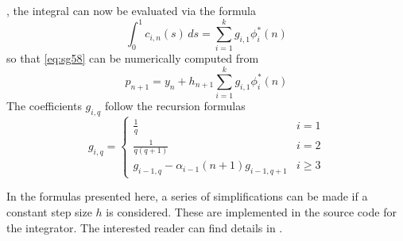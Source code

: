 \cite{Shampine1975}, the integral can now be evaluated via the formula
\begin{equation}
    \int_{0}^{1} c_{i,n}(s) \,ds = \sum_{i=1}^{k} g_{i,1} \phi ^{*}_{i}(n)
\end{equation}
so that \autoref{eq:sg58} can be numerically computed from
\begin{equation}\label{eq:sg511}
  p_{n+1} = y_n + h_{n+1}  \sum_{i=1}^{k} g_{i,1} \phi ^{*}_{i}(n)
\end{equation}
The coefficients $g_{i,q}$ follow the recursion formulas
\begin{equation}\label{eq:sg510}
  g_{i,q} = \begin{cases}
    \frac{1}{q} & i=1 \\
    \frac{1}{q(q+1)} & i=2 \\
    g_{i-1,q} - \alpha _{i-1}(n+1) g_{i-1,q+1} & i \ge 3
  \end{cases}
\end{equation}

In the formulas presented here, a series of simplifications can be made if a 
constant step size $h$ is considered. These are implemented in the source code for 
the integrator. The interested reader can find details in \cite{Shampine1975}.

\iffalse
\cite{Shampine1975}:
The overhead in these codes is rather high, partly because of the methods
and partly because of the features they provide. For example, DE detects
and deals with discontinuities; it detects and deals with moderate stiffness;
it detects and tells the user of severe stiffness; it detects requests for very
high accuracy and switches on propagated roundoff controls; it detects
requests for more accuracy than is possible on the machine being used and
tells the user what is possible; it is, for practical purposes, independent
of the number and location of output points; it monitors the work being
expended; it allows the user to change direction without restarting; and
it is extremely efficient in terms of function evaluations. 
\fi

